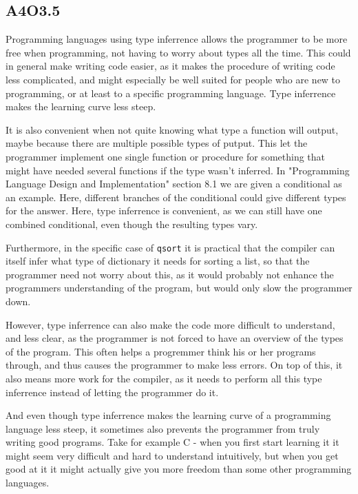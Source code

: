 \subsection*{A4O3.5}
Programming languages using type inferrence allows the programmer to be more free when programming, not having to worry about types all the time. This could in general make writing code easier, as it makes the procedure of writing code less complicated, and might especially be well suited for people who are new to programming, or at least to a specific programming language. Type inferrence makes the learning curve less steep. \par
It is also convenient when not quite knowing what type a function will output, maybe because there are multiple possible types of putput. This let the programmer implement one single function or procedure for something that might have needed several functions if the type wasn't inferred. In "Programming Language Design and Implementation" section 8.1 we are given a conditional as an example. Here, different branches of the conditional could give different types for the answer. Here, type inferrence is convenient, as we can still have one combined conditional, even though the resulting types vary. \par
Furthermore, in the specific case of \texttt{qsort} it is practical that the compiler can itself infer what type of dictionary it needs for sorting a list, so that the programmer need not worry about this, as it would probably not enhance the programmers understanding of the program, but would only slow the programmer down.\par

However, type inferrence can also make the code more difficult to understand, and less clear, as the programmer is not forced to have an overview of the types of the program. This often helps a progremmer think his or her programs through, and thus causes the programmer to make less errors. On top of this, it also means more work for the compiler, as it needs to perform all this type inferrence instead of letting the programmer do it.\par
And even though type inferrence makes the learning curve of a programming language less steep, it sometimes also prevents the programmer from truly writing good programs. Take for example C - when you first start learning it it might seem very difficult and hard to understand intuitively, but when you get good at it it might actually give you more freedom than some other programming languages.\par

